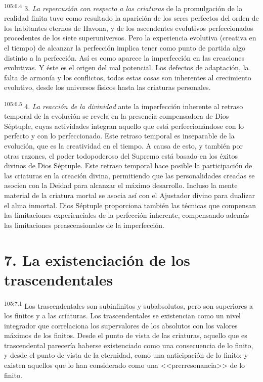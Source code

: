 \documentclass[twoside, 11pt]{book}
\begin{document}
\par
\textsuperscript{105:6.4} 3. \textit{La repercusión con respecto a las criaturas} de la promulgación de la realidad finita tuvo como resultado la aparición de los seres perfectos del orden de los habitantes eternos de Havona, y de los ascendentes evolutivos perfeccionados procedentes de los siete superuniversos. Pero la experiencia evolutiva (creativa en el tiempo) de alcanzar la perfección implica tener como punto de partida algo distinto a la perfección. Así es como aparece la imperfección en las creaciones evolutivas. Y éste es el origen del mal potencial. Los defectos de adaptación, la falta de armonía y los conflictos, todas estas cosas son inherentes al crecimiento evolutivo, desde los universos físicos hasta las criaturas personales.

\par
\textsuperscript{105:6.5} 4. \textit{La reacción de la divinidad} ante la imperfección inherente al retraso temporal de la evolución se revela en la presencia compensadora de Dios Séptuple, cuyas actividades integran aquello que está perfeccionándose con lo perfecto y con lo perfeccionado. Este retraso temporal es inseparable de la evolución, que es la creatividad en el tiempo. A causa de esto, y también por otras razones, el poder todopoderoso del Supremo está basado en los éxitos divinos de Dios Séptuple. Este retraso temporal hace posible la participación de las criaturas en la creación divina, permitiendo que las personalidades creadas se asocien con la Deidad para alcanzar el máximo desarrollo. Incluso la mente material de la criatura mortal se asocia así con el Ajustador divino para dualizar el alma inmortal. Dios Séptuple proporciona también las técnicas que compensan las limitaciones experienciales de la perfección inherente, compensando además las limitaciones preascensionales de la imperfección.

\section*{7. La existenciación de los trascendentales}
\par
\textsuperscript{105:7.1} Los trascendentales son subinfinitos y subabsolutos, pero son superiores a los finitos y a las criaturas. Los trascendentales se existencian como un nivel integrador que correlaciona los supervalores de los absolutos con los valores máximos de los finitos. Desde el punto de vista de las criaturas, aquello que es trascendental parecería haberse existenciado como una consecuencia de lo finito, y desde el punto de vista de la eternidad, como una anticipación de lo finito; y existen aquellos que lo han considerado como una <<prerresonancia>> de lo finito.
\end{document}
